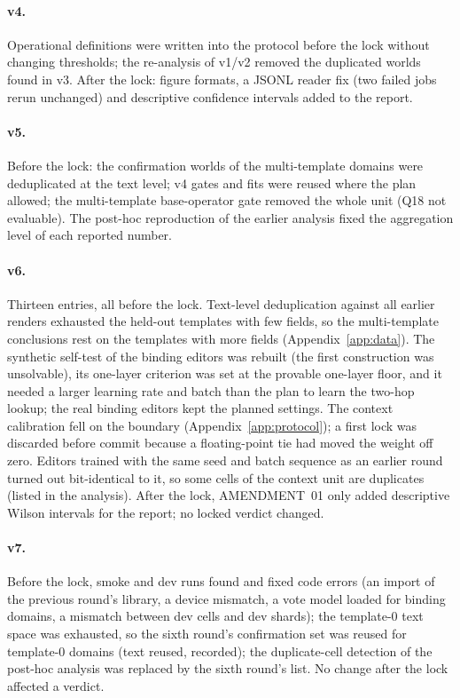 \paragraph{v4.}
Operational definitions were written into the protocol before the lock without changing thresholds; the re-analysis of v1/v2 removed the
duplicated worlds found in v3. After the lock: figure formats, a JSONL reader fix (two failed jobs rerun unchanged) and descriptive
confidence intervals added to the report.

\paragraph{v5.}
Before the lock: the confirmation worlds of the multi-template domains were deduplicated at the text level; v4 gates and fits were
reused where the plan allowed; the multi-template base-operator gate removed the whole unit (Q18 not evaluable). The post-hoc
reproduction of the earlier analysis fixed the aggregation level of each reported number.

\paragraph{v6.}
Thirteen entries, all before the lock. Text-level deduplication against all earlier renders exhausted the held-out templates with few
fields, so the multi-template conclusions rest on the templates with more fields (Appendix~\ref{app:data}). The synthetic self-test of
the binding editors was rebuilt (the first construction was unsolvable), its one-layer criterion was set at the provable one-layer floor,
and it needed a larger learning rate and batch than the plan to learn the two-hop lookup; the real binding editors kept the planned
settings. The context calibration fell on the boundary (Appendix~\ref{app:protocol}); a first lock was discarded before commit because
a floating-point tie had moved the weight off zero. Editors trained with the same seed and batch sequence as an earlier round turned out
bit-identical to it, so some cells of the context unit are duplicates (listed in the analysis). After the lock, AMENDMENT~01 only added
descriptive Wilson intervals for the report; no locked verdict changed.

\paragraph{v7.}
Before the lock, smoke and dev runs found and fixed code errors (an import of the previous round's library, a device mismatch, a vote model
loaded for binding domains, a mismatch between dev cells and dev shards); the template-0 text space was exhausted, so the sixth round's
confirmation set was reused for template-0 domains (text reused, recorded); the duplicate-cell detection of the post-hoc analysis was
replaced by the sixth round's list. No change after the lock affected a verdict.

